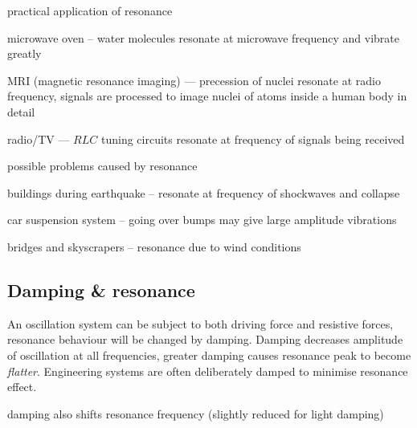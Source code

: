 \documentclass[a4paper,12pt]{book}
\newcommand{\cmt}{}
\newcommand{\cmt}{}
\begin{document}
\cmt practical application of resonance

\begin{compactitem}
\item[-] microwave oven -- water molecules resonate at microwave frequency and vibrate greatly
\item[-] MRI (magnetic resonance imaging) --- precession of nuclei resonate at radio frequency, signals are processed to image nuclei of atoms inside a human body in detail
\item[-] radio/TV --- $RLC$ tuning circuits resonate at frequency of signals being received
\end{compactitem}

\cmt possible problems caused by resonance

\begin{compactitem}
\item[-] buildings during earthquake -- resonate at frequency of shockwaves and collapse
\item[-] car suspension system -- going over bumps may give large amplitude vibrations
\item[--] bridges and skyscrapers -- resonance due to wind conditions
\end{compactitem}

\subsection{Damping \& resonance}

An oscillation system can be subject to both driving force and resistive forces, resonance behaviour will be changed by damping.
Damping decreases amplitude of oscillation at all frequencies, greater damping causes resonance peak to become \emph{flatter}. Engineering systems are often deliberately damped to minimise resonance effect.

\cmt damping also shifts resonance frequency (slightly reduced for light damping)
\end{document}
